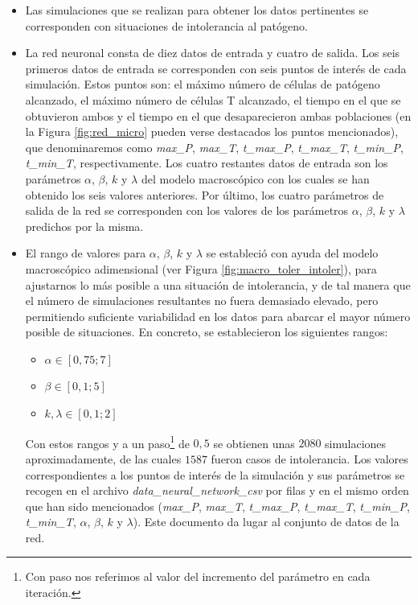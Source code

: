 \begin{itemize}
	\item Las simulaciones que se realizan para obtener los datos pertinentes se corresponden con situaciones de intolerancia al patógeno.
	
	\item La red neuronal consta de diez datos de entrada y cuatro de salida. Los seis primeros datos de entrada se corresponden con seis puntos de interés de cada simulación. Estos puntos son: el máximo número de células de patógeno alcanzado, el máximo número de células T alcanzado, el tiempo en el que se obtuvieron ambos y el tiempo en el que desaparecieron ambas poblaciones (en la Figura \ref{fig:red_micro} pueden verse destacados los puntos mencionados), que denominaremos como \textit{max\_P}, \textit{max\_T}, \textit{t\_max\_P}, \textit{t\_max\_T}, \textit{t\_min\_P}, \textit{t\_min\_T}, respectivamente. Los cuatro restantes datos de entrada son los parámetros $\alpha$, $\beta$, $k$ y $\lambda$ del modelo macroscópico con los cuales se han obtenido los seis valores anteriores. Por último, los cuatro parámetros de salida de la red se corresponden con los valores de los parámetros $\alpha$, $\beta$, $k$ y $\lambda$ predichos por la misma.
	
	\item El rango de valores para $\alpha$, $\beta$, $k$ y $\lambda$ se estableció con ayuda del modelo macroscópico adimensional (ver Figura \ref{fig:macro_toler_intoler}), para ajustarnos lo más posible a una situación de intolerancia, y de tal manera que el número de simulaciones resultantes no fuera demasiado elevado, pero permitiendo suficiente variabilidad en los datos para abarcar el mayor número posible de situaciones. En concreto, se establecieron los siguientes rangos:
	
	\begin{itemize}
		\item $\alpha \in  [0,75;7]$
		\item $\beta \in [0,1;5]$
		\item $k, \lambda \in [0,1;2]$
	\end{itemize}
	
	Con estos rangos y a un paso\footnote{Con paso nos referimos al valor del incremento del parámetro en cada iteración.} de $0,5$ se obtienen unas $2080$ simulaciones aproximadamente, de las cuales $1587$ fueron casos de intolerancia. Los valores correspondientes a los puntos de interés de la simulación y sus parámetros se recogen en el archivo \textit{data\_neural\_network\_csv} por filas y en el mismo orden que han sido mencionados (\textit{max\_P}, \textit{max\_T}, \textit{t\_max\_P}, \textit{t\_max\_T}, \textit{t\_min\_P}, \textit{t\_min\_T}, $\alpha$, $\beta$, $k$ y $\lambda$). Este documento da lugar al conjunto de datos de la red.
	

\end{itemize}
